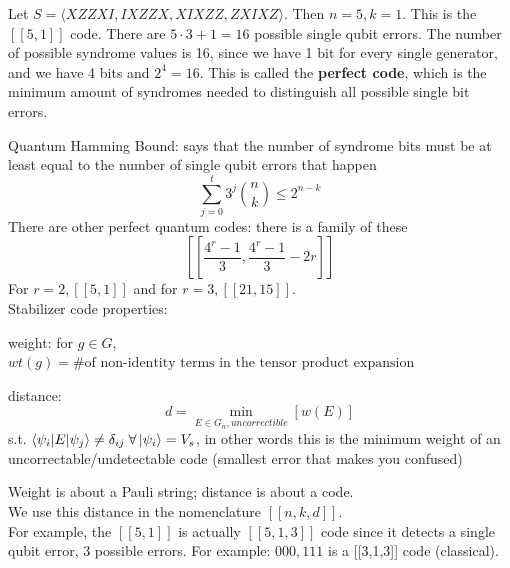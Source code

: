 \begin{example}
    Let $S = \langle XZZXI, IXZZX, XIXZZ, ZXIXZ\rangle$. Then $n=5, k = 1$. This is the $[[5,1]]$ code. There are $5\cdot 3 + 1 = 16$ possible single qubit errors. The number of possible syndrome values is 16, since we have 1 bit for every single generator, and we have 4 bits and $2^4 = 16$. This is called the \textbf{perfect code}, which is the minimum amount of syndromes needed to distinguish all possible single bit errors. 
\end{example}
Quantum Hamming Bound: says that the number of syndrome bits must be at least equal to the number of single qubit errors that happen 
\begin{equation}
    \sum_{j=0}^t 3^j {{n}\choose{k}} \leq 2^{n-k}
\end{equation}
There are other perfect quantum codes: there is a family of these
\begin{equation}
    \left[\left[\frac{4^r -1}{3}, \frac{4^r-1}{3}-2r\right]\right]
\end{equation}
For $r=2, [[5,1]]$ and for $r=3, [[21,15]]$. \\

Stabilizer code properties: 
    \begin{definition}
        weight: for $g \in G$, $wt(g) = \text{\# of non-identity terms in the tensor product expansion}$
    \end{definition}
    \begin{definition}
        distance: 
        \begin{equation}
            d = \min_{E \in G_n, uncorrectible}[w(E)]
        \end{equation}
        s.t. $\braket{\psi_i|E|\psi_j} \neq \delta_{ij} \; \forall \ket{\psi_i} = V_s$, in other words this is the minimum weight of an uncorrectable/undetectable code (smallest error that makes you confused)
    \end{definition}
Weight is about a Pauli string; distance is about a code. \\
We use this distance in the nomenclature $[[n,k,d]]$. \\
For example, the $[[5,1]]$ is actually $[[5,1,3]]$ code since it detects a single qubit error, 3 possible errors. For example: $000,111$ is a [[3,1,3]] code (classical).  \\

